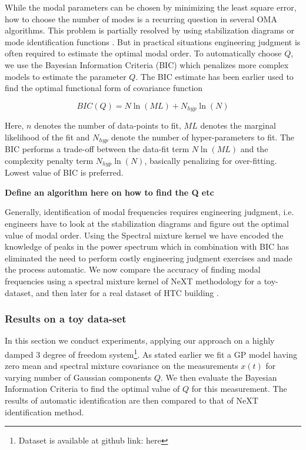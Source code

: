 While the modal parameters can be chosen by minimizing the least square error, how to choose the number of modes is a recurring question in several OMA algorithms. This problem is partially resolved by using stabilization diagrams or mode identification functions \cite{allemang1998unified, williams1985multivariate, shih1988complex}. But in practical situations engineering judgment is often required to estimate the optimal modal order. To automatically choose \(Q\), we use the Bayesian Information Criteria (BIC) \cite{findley1991counterexamples} which penalizes more complex models to estimate the parameter \(Q\). The BIC estimate has been earlier used to find the optimal functional form of covariance function \cite{duvenaud2013structure}

\textbf{\begin{equation}\label{eq:BIC}
    BIC(Q) = N\ln(ML) + N_{hyp}\ln(N)
\end{equation}}

Here, \(n\) denotes the number of data-points to fit, \(ML\) denotes the marginal likelihood of the fit and \(N_{hyp}\) denote the number of hyper-parameters to fit. The BIC performs a trade-off between the data-fit term \(N\ln(ML)\) and the complexity penalty term \(N_{hyp}\ln(N)\), basically penalizing for over-fitting. Lowest value of BIC is preferred. 

\textbf{Define an algorithm here on how to find the Q etc}

Generally, identification of modal frequencies requires engineering judgment, i.e. engineers have to look at the stabilization diagrams and figure out the optimal value of modal order. Using the Spectral mixture kernel we have encoded the knowledge of peaks in the power spectrum which in combination with BIC has eliminated the need to perform costly engineering judgment exercises and made the process automatic. We now compare the accuracy of finding modal frequencies using a spectral mixture kernel of NeXT methodology for a toy-dataset, and then later for a real dataset of HTC building \cite{brincker2000modal}.

\subsubsection{Results on a toy data-set}
In this section we conduct experiments, applying our approach on a highly damped 3 degree of freedom system\footnote{Dataset is available at github link: here}. As stated earlier we fit a GP model having zero mean and spectral mixture covariance on the measurements \(x(t)\) for varying number of Gaussian components \(Q\). We then evaluate the Bayesian Information Criteria to find the optimal value of \(Q\) for this measurement. The results of automatic identification are then compared to that of NeXT identification method. 

